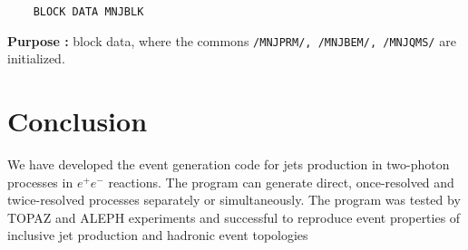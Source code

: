 \newlength{\MNJBLK}
\settowidth{\MNJBLK}{\tt     BLOCK DATA MNJBLK}
\begin{verbatim}
    BLOCK DATA MNJBLK
\end{verbatim}
\vspace{-28pt}
\hspace*{4ex}\fbox{\rule[14pt]{\MNJBLK}{0cm}}
\begin{list}{ }{\parsep=0pt \itemsep=0pt \topsep=0pt }
\item[\bf Purpose :] block data, where the commons
{\tt /MNJPRM/, /MNJBEM/, /MNJQMS/} are initialized.
\end{list}





\section{Conclusion}
We have developed the event generation code for jets production
in two-photon processes in $e^+e^-$ reactions.
The program can generate direct, once-resolved and twice-resolved
processes separately or simultaneously.
The program was tested by TOPAZ and ALEPH 
experiments and
successful to reproduce event properties of
inclusive jet production and hadronic event topologies


